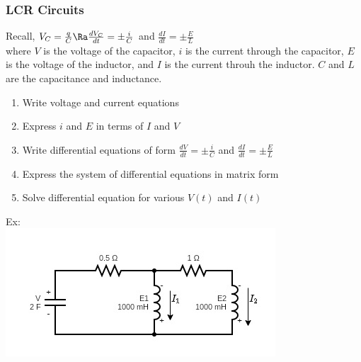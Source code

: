 \subsubsection{LCR Circuits}
Recall, $V_C=\frac{q}{C}\Ra\frac{dV_C}{dt}=\pm\frac{i}{C}$ and $\frac{dI}{dt}=\pm\frac{E}{L}$\\
where $V$ is the voltage of the capacitor, $i$ is the current through the capacitor, $E$ is the voltage of the inductor, and $I$ is the current throuh the inductor. $C$ and $L$ are the capacitance and inductance. 
\begin{enumerate}
    \item Write voltage and current equations
    \item Express $i$ and $E$ in terms of $I$ and $V$
    \item Write differential equations of form $\frac{dV}{dt}=\pm\frac{i}{C}$ and $\frac{dI}{dt}=\pm\frac{E}{L}$
    \item Express the system of differential equations in matrix form
    \item Solve differential equation for various $V(t)$ and $I(t)$
\end{enumerate}
Ex:\\
\includegraphics[scale=0.8]{Images/LinearAlgebraPictures/LCRcircuitEx.jpg}
